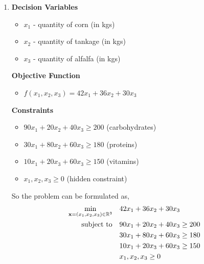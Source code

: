 \begin{enumerate}
    \item
          \begin{minipage}[t]{0.45\textwidth}
              \textbf{Decision Variables}
              \begin{itemize}
                  \item \(x_1\) - quantity of corn (in kgs)
                  \item \(x_2\) - quantity of tankage (in kgs)
                  \item \(x_3\) - quantity of alfalfa (in kgs)
              \end{itemize}
              \textbf{Objective Function}
              \begin{itemize}
                  \item \(f(x_1, x_2, x_3) = 42x_1 + 36x_2 + 30x_3\)
              \end{itemize}
          \end{minipage}
          \hfill
          \begin{minipage}[t]{0.45\textwidth}
              \textbf{Constraints}
              \begin{itemize}
                  \item \(90x_1 + 20x_2 + 40x_3 \geq 200\) (carbohydrates)
                  \item \(30x_1 + 80x_2 + 60x_3 \geq 180\) (proteins)
                  \item \(10x_1 + 20x_3 + 60x_3 \geq 150\) (vitamins)
                  \item \(x_1, x_2, x_3 \geq 0\) (hidden constraint)
              \end{itemize}
          \end{minipage}

          So the problem can be formulated as,
          \begin{align*}
              \min_{\mathbf{x} = (x_1, x_2, x_3) \in \mathbb{R}^3} \quad & 42x_1 + 36x_2 + 30x_3          \\
              \text{subject to}\quad                       & 90x_1 + 20x_2 + 40x_3 \geq 200 \\
                                                           & 30x_1 + 80x_2 + 60x_3 \geq 180 \\
                                                           & 10x_1 + 20x_3 + 60x_3 \geq 150 \\
                                                           & x_1, x_2, x_3 \geq 0\end{align*}
\end{enumerate}

